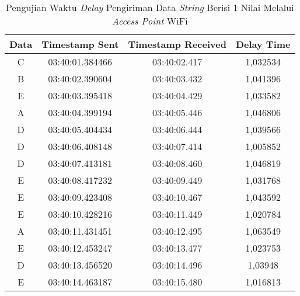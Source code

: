 \begin{table}[!ht]
  \centering
    \caption{Pengujian Waktu \emph{Delay} Pengiriman Data \emph{String} Berisi 1 Nilai Melalui \emph{Access Point} WiFi}
    \label{tbl:delayWiFi1}
    \begin{tabular}{|ccc|c|}
    \hline
    \multicolumn{1}{|c|}{Data} & \multicolumn{1}{c|}{Timestamp Sent}  & Timestamp Received & Delay Time \\ \hline
    \multicolumn{1}{|c|}{C}    & \multicolumn{1}{c|}{03:40:01.384466} & 03:40:02.417       & 1,032534   \\ \hline
    \multicolumn{1}{|c|}{B}    & \multicolumn{1}{c|}{03:40:02.390604} & 03:40:03.432       & 1,041396   \\ \hline
    \multicolumn{1}{|c|}{E}    & \multicolumn{1}{c|}{03:40:03.395418} & 03:40:04.429       & 1,033582   \\ \hline
    \multicolumn{1}{|c|}{A}    & \multicolumn{1}{c|}{03:40:04.399194} & 03:40:05.446       & 1,046806   \\ \hline
    \multicolumn{1}{|c|}{D}    & \multicolumn{1}{c|}{03:40:05.404434} & 03:40:06.444       & 1,039566   \\ \hline
    \multicolumn{1}{|c|}{D}    & \multicolumn{1}{c|}{03:40:06.408148} & 03:40:07.414       & 1,005852   \\ \hline
    \multicolumn{1}{|c|}{D}    & \multicolumn{1}{c|}{03:40:07.413181} & 03:40:08.460       & 1,046819   \\ \hline
    \multicolumn{1}{|c|}{E}    & \multicolumn{1}{c|}{03:40:08.417232} & 03:40:09.449       & 1,031768   \\ \hline
    \multicolumn{1}{|c|}{E}    & \multicolumn{1}{c|}{03:40:09.423408} & 03:40:10.467       & 1,043592   \\ \hline
    \multicolumn{1}{|c|}{E}    & \multicolumn{1}{c|}{03:40:10.428216} & 03:40:11.449       & 1,020784   \\ \hline
    \multicolumn{1}{|c|}{A}    & \multicolumn{1}{c|}{03:40:11.431451} & 03:40:12.495       & 1,063549   \\ \hline
    \multicolumn{1}{|c|}{E}    & \multicolumn{1}{c|}{03:40:12.453247} & 03:40:13.477       & 1,023753   \\ \hline
    \multicolumn{1}{|c|}{D}    & \multicolumn{1}{c|}{03:40:13.456520} & 03:40:14.496       & 1,03948    \\ \hline
    \multicolumn{1}{|c|}{E}    & \multicolumn{1}{c|}{03:40:14.463187} & 03:40:15.480       & 1,016813   \\ \hline

\end{tabular}
\end{table}

